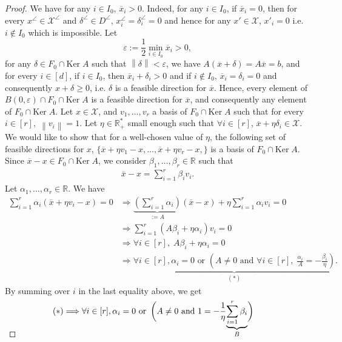 \documentclass[11pt]{article}
\theoremstyle{plain}
\theoremstyle{definition}
\newcommand{\R}[0]{\mathbb R}
\newcommand{\Ker}[0]{\mathrm{Ker}\;}
\newcommand{\norm}[1]{\left\lVert#1\right\rVert}
\newcommand{\cX}{\mathcal{X}}
\begin{document}
\begin{proof}
        We have for any $i\in I_0$, $\overline{x}_i>0$. Indeed, for any $i\in I_0$, if $\overline{x}_i=0$, then for every $x^\angle \in \cX^\angle$ and $\delta^\angle \in D^\angle$, $x_i^\angle=\delta_i^\angle =0$ and hence for any $x'\in \cX$, $x'_i=0$ i.e. $i\not \in I_0$ which is impossible. Let $$\varepsilon:=\frac{1}{2}\min_{i\in I_0}\overline{x}_i>0,$$ for any $\delta \in F_0 \cap \Ker A$ such that $\norm{\delta}<\varepsilon$, we have $A(\overline{x}+\delta)=A\overline{x}=b$, and for every $i\in [d]$, if $i\in I_0$, then $\overline{x}_i + \delta _i >0$ and if $i\not\in I_0$, $\overline{x}_i=\delta_i=0$ and consequently $x+\delta \geq 0$, i.e. $\delta$ is a feasible direction for $\overline{x}$. Hence, every element of $B(0,\varepsilon)\cap F_0 \cap \Ker A$ is a feasible direction for $\overline{x}$, and consequently any element of $F_0 \cap \Ker A$. Let $x\in \cX$, and $v_1,\dots, v_r$ a basis of $F_0\cap \Ker A$ such that for every $i\in [r],\; \norm{v_i}=1$. Let $\eta \in \R^*_+$ small enough such that $\forall i \in [r]$, $\overline{x} + \eta \delta _i \in \cX$. We would like to show that for a well-chosen value of $\eta$, the following set of feasible directions for $x$, $\{\overline{x}+\eta v_1 - x,\dots,\overline{x}+\eta v_r - x,\}$ is a basis of $F_0 \cap \Ker A$. Since $\overline{x}-x\in F_0 \cap \Ker A$, we consider $\beta_1,\dots,\beta_r\in \R$ such that 
        \begin{align*}
            \overline{x}-x=\sum_{i=1}^{r}\beta_i v_i.
        \end{align*}
        Let $\alpha_1,\dots,\alpha_r\in \R$. We have 
        \begin{align*}
            \sum_{i=1}^{r}\alpha_i(\overline{x}+\eta v_i-x)=0 &\Longrightarrow \underbrace{\left(\sum_{i=1}^{r}\alpha_i\right)}_{:=A}(\overline{x}-x)+\eta \sum_{i=1}^{r}\alpha_i v_i=0\\
            &\Longrightarrow \sum_{i=1}^{r}(A\beta_i + \eta \alpha_i)v_i=0\\
            &\Longrightarrow \forall i \in [r],\; A\beta_i + \eta \alpha_i=0\\
            &\Longrightarrow \underbrace{ \forall i\in [r], \alpha_i=0 \text{ or }\left( A\neq 0 \text{ and } \forall i \in [r],\;\frac{\alpha_i}{A}=-\frac{\beta_i}{\eta}\right)}_{(*)}.
        \end{align*}
        By summing over $i$ in the last equality above, we get
        \begin{align*}
            (*)&\Longrightarrow  \forall i\in [r], \alpha_i=0 \text{ or }\left( A\neq 0 \text{ and } 1=-\frac{1}{\eta}\smash{\underbrace{\sum_{i=1}^{r}\beta_i}_{B}} \right)
        \end{align*}
        

\end{proof}
\end{document}
